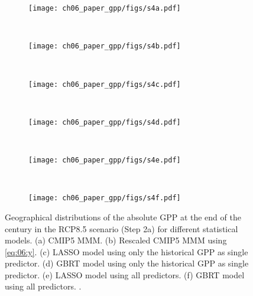 \begin{figure}[p]
  \centering
  \begin{subfigure}[b]{\SubfigureWidth{}}
    \texttt{[image: ch06\_paper\_gpp/figs/s4a.pdf]}
    \caption{}
    \label{fig:app:b:step2a_results:a}
  \end{subfigure}
  ~
  \begin{subfigure}[b]{\SubfigureWidth{}}
    \texttt{[image: ch06\_paper\_gpp/figs/s4b.pdf]}
    \caption{}
    \label{fig:app:b:step2a_results:b}
  \end{subfigure}
  \\
    \begin{subfigure}[b]{\SubfigureWidth{}}
    \texttt{[image: ch06\_paper\_gpp/figs/s4c.pdf]}
    \caption{}
    \label{fig:app:b:step2a_results:c}
  \end{subfigure}
  ~
  \begin{subfigure}[b]{\SubfigureWidth{}}
    \texttt{[image: ch06\_paper\_gpp/figs/s4d.pdf]}
    \caption{}
    \label{fig:app:b:step2a_results:d}
  \end{subfigure}
  \\
    \begin{subfigure}[b]{\SubfigureWidth{}}
    \texttt{[image: ch06\_paper\_gpp/figs/s4e.pdf]}
    \caption{}
    \label{fig:app:b:step2a_results:e}
  \end{subfigure}
  ~
  \begin{subfigure}[b]{\SubfigureWidth{}}
    \texttt{[image: ch06\_paper\_gpp/figs/s4f.pdf]}
    \caption{}
    \label{fig:app:b:step2a_results:f}
  \end{subfigure}
  \caption[
    Geographical distributions of the absolute \acf{GPP} at the end of the
     century in the \acs{RCP}8.5 scenario (Step 2a) for different
    statistical models.
  ]{
    Geographical distributions of the absolute \acf{GPP} at the end of the
     century in the \acs{RCP}8.5 scenario (Step 2a) for different
    statistical models. (a) \acs{CMIP}5 \acf{MMM}. (b) Rescaled \acs{CMIP}5
    \acs{MMM} using \cref{eq:06:y}. (c) \Acf{LASSO} model using only the
    historical \acs{GPP} as single predictor. (d) \Acf{GBRT} model using only
    the historical \acs{GPP} as single predictor. (e) \acs{LASSO} model using
    all predictors. (f) \acs{GBRT} model using all predictors.
    .
  }
  \label{fig:app:b:step2a_results}
\end{figure}

